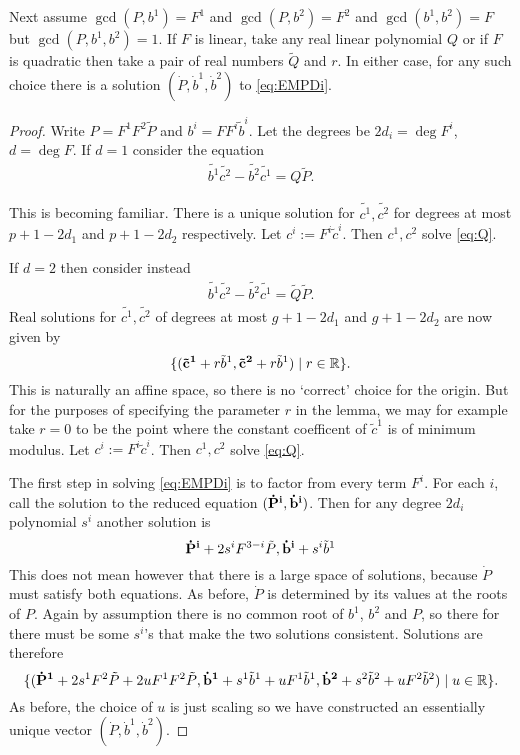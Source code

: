 \begin{lem}
Next assume $\gcd(P,b^1)=F^1$ and $\gcd(P,b^2)=F^2$ and $\gcd(b^1,b^2)=F$ but $\gcd(P,b^1,b^2)=1$. If $F$ is linear, take any real linear polynomial $Q$ or if $F$ is quadratic then take a pair of real numbers $\tilde Q$ and $r$. In either case, for any such choice there is a solution $(\dot P, \dot b^1, \dot b^2)$ to \eqref{eq:EMPDi}.
\begin{proof}

Write $P = F^1F^2\tilde{P}$ and $b^i = FF^i\tilde b^i$. Let the degrees be $2d_i = \deg F^i$, $d = \deg F$. If $d=1$ consider the equation
\begin{align}
\tilde{b^1}\tilde{c^2} - \tilde{b^2}\tilde{c^1} = Q\tilde{P}.
\end{align}

This is becoming familiar. There is a unique solution for $\tilde{c^1},\tilde{c^2}$ for degrees at most $p+1-2d_1$ and $p+1-2d_2$ respectively. Let $c^i :=  F^i\tilde{c}^i$. Then $c^1, c^2$ solve \eqref{eq:Q}.

If $d=2$ then consider instead
\begin{align}
\tilde{b^1}\tilde{c^2} - \tilde{b^2}\tilde{c^1} = \tilde{Q}\tilde{P}.
\end{align}
Real solutions for $\tilde{c^1},\tilde{c^2}$ of degrees at most $g+1-2d_1$ and $g+1-2d_2$ are now given by
\[
\{ ({\bf \tilde c^1} + r \tilde{b}^1, {\bf \tilde c^2} + r \tilde{b}^1) \mid r\in \mathbb{R}\}.
\]
This is naturally an affine space, so there is no `correct' choice for the origin. But for the purposes of specifying the parameter $r$ in the lemma, we may for example take $r=0$ to be the point where the constant coefficent of $\tilde c^1$ is of minimum modulus. Let $c^i :=  F^i\tilde{c}^i$. Then $c^1, c^2$ solve \eqref{eq:Q}.

The first step in solving \eqref{eq:EMPDi} is to factor from every term $F^i$. For each $i$, call the solution to the reduced equation $({\bf\dot P^i}, {\bf\dot b^i})$. Then for any degree $2d_i$ polynomial $s^i$ another solution is
\[
{\bf\dot P^i} + 2s^i F^{3-i}\tilde P, {\bf\dot b^i} + s^i \tilde b^1
\]
This does not mean however that there is a large space of solutions, because $\dot P$ must satisfy both equations. As before, $\dot P$ is determined by its values at the roots of $P$. Again by assumption there is no common root of $b^1$, $b^2$ and $P$, so there for there must be some $s^i$'s that make the two solutions consistent. Solutions are therefore
\[
\{ ({\bf \dot P^1} + 2s^1 F^2 \tilde{P} + 2u F^1F^2\tilde{P}, {\bf \dot b^1} + s^1\tilde{b}^1 + u F^1\tilde{b}^1, {\bf \dot b^2} + s^2\tilde{b}^2 + uF^2 \tilde{b}^2) \mid u \in \mathbb{R}\}.
\]
As before, the choice of $u$ is just scaling so we have constructed an essentially unique vector $(\dot P, \dot b^1, \dot b^2)$.
\end{proof}
\end{lem}













